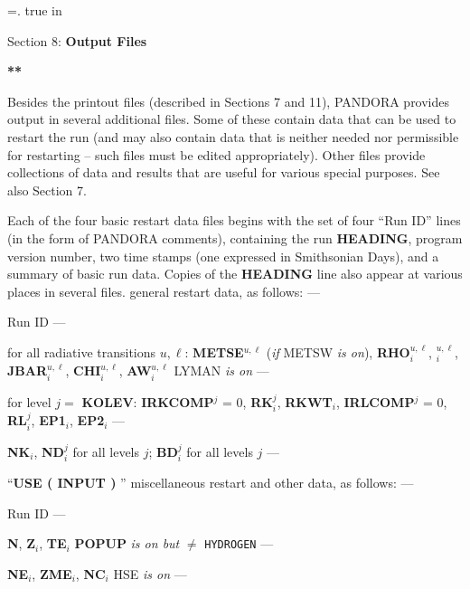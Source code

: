 %
\newtoks\footline \footline={\hss{}.\folio\hss}
\top
{} true in
\centerline{Section 8: {\bf Output Files}}
\blankline
\blankline
\centerline{\bf ***}
\blankline
\blankline
Besides the printout files (described in Sections 7 and 11),
PANDORA provides output in several
additional files. Some of these contain data that can be used to
restart the run (and may also contain data that is neither needed
nor permissible for restarting -- such files must be edited appropriately).
Other files provide collections of data and results that are useful
for various special purposes. See also Section 7.

Each of the four basic restart data files begins with the set of four
``Run ID'' lines (in the form of PANDORA comments), containing the run
{\bf HEADING}, program version number, two time stamps (one expressed in
Smithsonian Days), and a summary of basic run data. Copies of the 
{\bf HEADING} line also appear at various places in several files.
\blankline
\blankline
{} general restart data,
as follows: 
\blankline
{} --- \par \noindent
Run ID
\spice
{} --- \par \noindent
for all radiative transitions $u,\ell$:
{\bf METSE}$^{u,\ell}$ ({\it if} METSW {\it is on}), {\bf RHO}$^{u,\ell}_i$,
$^{u,\ell}_i$, {\bf JBAR}$^{u,\ell}_i$, {\bf CHI}$^{u,\ell}_i$,
{\bf AW}$^{u,\ell}_i$
\spice
{} LYMAN {\it is on} --- \par \noindent
for level $j =$ {\bf KOLEV}:
{\bf IRKCOMP}$^j$ = 0, {\bf RK}$^j_i$, {\bf RKWT}$_i$, {\bf IRLCOMP}$^j$ = 0, 
{\bf RL}$^j_i$, {\bf EP1}$_i$, {\bf EP2}$_i$
\spice
{} --- \par \noindent
{\bf NK}$_i$, 
{\bf ND}$^j_i$ for all levels $j$; {\bf BD}$^j_i$ for all levels $j$
\spice
{} --- \par \noindent
``{\bf USE ( INPUT ) }''
\ej
{} miscellaneous restart
and other data, as follows:
\blankline
{} --- \par \noindent
Run ID
\spice
{} --- \par \noindent
{\bf N}, {\bf Z}$_i$, {\bf TE}$_i$
\spice
{} {\bf POPUP} {\it is on but} $\neq$ {\tt HYDROGEN} --- 
\par \noindent
{\bf NE}$_i$, {\bf ZME}$_i$, {\bf NC}$_i$
\spice
{} HSE {\it is on} --- \par \noindent
